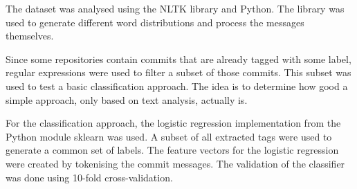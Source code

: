 The dataset was analysed using the NLTK library \cite{nltk} and Python.
The library was used to generate different word distributions and process
the messages themselves.

Since some repositories contain commits that are already tagged with some label,
regular expressions were used to filter a subset of those commits.
This subset was used to test a basic classification approach. The idea is to
determine how good a simple approach, only based on text analysis, actually is.

For the classification approach, the logistic regression implementation from
the Python module sklearn \cite{sklearn} was used. A subset of all extracted
tags were used to generate a common set of labels.
The feature vectors for the logistic regression were created by tokenising the
commit messages. The validation of the classifier was done using
10-fold cross-validation.
